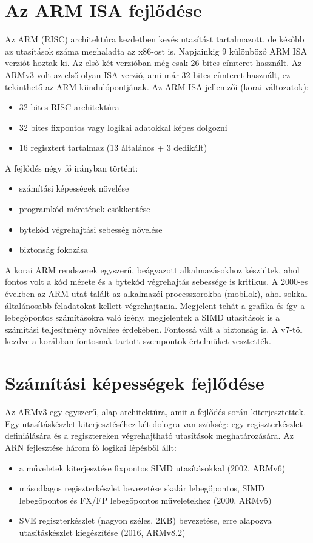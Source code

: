 \section{Az ARM ISA fejlődése}
 Az ARM (RISC) architektúra kezdetben kevés utasítást tartalmazott, de később az utasítások száma meghaladta az x86-ost is.
 Napjainkig 9 különböző ARM ISA verziót hoztak ki.
 Az első két verzióban még csak 26 bites címteret használt.
 Az ARMv3 volt az első olyan ISA verzió, ami már 32 bites címteret használt, ez tekinthető az ARM kiindulópontjának.
 Az ARM ISA jellemzői (korai változatok):
 \begin{itemize}
     \item 32 bites RISC architektúra
     \item 32 bites fixpontos vagy logikai adatokkal képes dolgozni
     \item 16 regisztert tartalmaz (13 általános + 3 dedikált)
 \end{itemize}
 A fejlődés négy fő irányban történt:
 \begin{itemize}
     \item számítási képességek növelése
     \item programkód méretének csökkentése
     \item bytekód végrehajtási sebesség növelése
     \item biztonság fokozása
 \end{itemize}
 A korai ARM rendszerek egyszerű, beágyazott alkalmazásokhoz készültek, ahol fontos volt a kód mérete és a bytekód végrehajtás sebessége is kritikus.
 A 2000-es években az ARM utat talált az alkalmazói processzorokba (mobilok), ahol sokkal általánosabb feladatokat kellett végrehajtania.
 Megjelent tehát a grafika és így a lebegőpontos számításokra való igény, megjelentek a SIMD utasítások is a számítási teljesítmény növelése érdekében.
 Fontossá vált a biztonság is.
 A v7-től kezdve a korábban fontosnak tartott szempontok értelmüket vesztették.

 \section{Számítási képességek fejlődése}
 Az ARMv3 egy egyszerű, alap architektúra, amit a fejlődés során kiterjesztettek.
 Egy utasításkészlet kiterjesztéséhez két dologra van szükség: egy regiszterkészlet definiálására és a regisztereken végrehajtható utasítások meghatározására.
 Az ARN fejlesztése három fő logikai lépésből állt:
 \begin{itemize}
     \item a műveletek kiterjesztése fixpontos SIMD utasításokkal (2002, ARMv6)
     \item másodlagos regiszterkészlet bevezetése skalár lebegőpontos, SIMD lebegőpontos és FX/FP lebegőpontos műveletekhez (2000, ARMv5)
     \item SVE regiszterkészlet (nagyon széles, 2KB) bevezetése, erre alapozva utasításkészlet kiegészítése (2016, ARMv8.2)
 \end{itemize}

